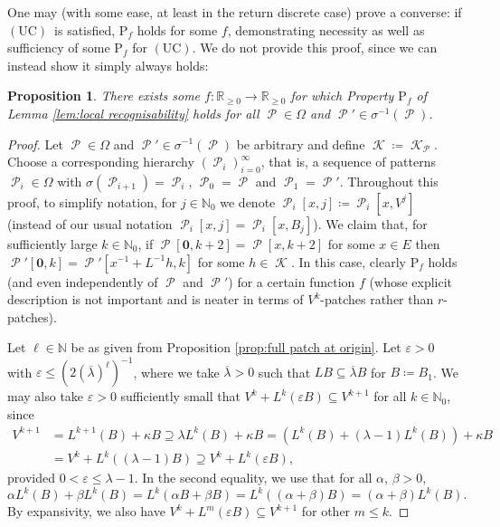 \documentclass[11pt]{amsart}
\numberwithin{equation}{section}
\theoremstyle{plain}
\newtheorem{proposition}[theorem]{Proposition}
\theoremstyle{definition}
\newcommand{\R}{\mathbb R}
\newcommand{\N}{\mathbb N}
\renewcommand{\epsilon}{\varepsilon}
\newcommand{\sub}{\sigma}
\DeclareMathOperator{\cP}{\mathcal{P}}
\DeclareMathOperator{\cK}{\mathcal{K}}
\newcommand{\UC}{\(\mathrm{(UC)}\)}
\begin{document}
One may (with some ease, at least in the return discrete case) prove a converse: if \UC\ is satisfied, \(\mathrm{P}_f\) holds for some \(f\), demonstrating necessity as well as sufficiency of some \(\mathrm{P}_f\) for \UC. We do not provide this proof, since we can instead show it simply always holds:

\begin{proposition}\label{prop:L-sub=>Pf}
There exists some \(f \colon \R_{\geq 0} \to \R_{\geq 0}\) for which Property \(\mathrm{P}_f\) of Lemma \ref{lem:local recognisability} holds for all \(\cP \in \Omega\) and \(\cP' \in \sub^{-1}(\cP)\).
\end{proposition}

\begin{proof}
Let \(\cP \in \Omega\) and \(\cP' \in \sub^{-1}(\cP)\) be arbitrary and define \(\cK \coloneqq \cK_{\cP}\). Choose a corresponding hierarchy \((\cP_i)_{i=0}^\infty\), that is, a sequence of patterns \(\cP_i \in \Omega\) with \(\sub(\cP_{i+1}) = \cP_i\), \(\cP_0 = \cP\) and \(\cP_1 = \cP'\). Throughout this proof, to simplify notation, for \(j \in \N_0\) we denote \(\cP_i[x,j] \coloneqq \cP_i[x,V^j]\) (instead of our usual notation \(\cP_i[x,j] = \cP_i[x,B_j]\)). We claim that, for sufficiently large \(k \in \N_0\), if \(\cP[\mathbf{0},k+2] = \cP[x,k+2]\) for some \(x \in E\) then \(\cP'[\mathbf{0},k] = \cP'[x^{-1} + L^{-1} h,k]\) for some \(h \in \cK\). In this case, clearly \(\mathrm{P}_f\) holds (and even independently of \(\cP\) and \(\cP'\)) for a certain function \(f\) (whose explicit description is not important and is neater in terms of \(V^k\)-patches rather than \(r\)-patches).

Let \(\ell \in \N\) be as given from Proposition \ref{prop:full patch at origin}. Let \(\epsilon > 0\) with \(\epsilon \leq (2(\overline{\lambda})^\ell)^{-1}\), where we take \(\overline{\lambda} > 0\) such that \(LB \subseteq \overline{\lambda} B\) for \(B \coloneqq B_1\). We may also take \(\epsilon > 0\) sufficiently small that \(V^k + L^k(\epsilon B) \subseteq V^{k+1}\) for all \(k \in \N_0\), since
\begin{align*}
V^{k+1} &= L^{k+1}(B) + \kappa B \supseteq \lambda L^k(B) + \kappa B = (L^k(B) + (\lambda - 1)L^k(B)) + \kappa B\\
        &= V^k + L^k((\lambda - 1)B) \supseteq V^k + L^k(\epsilon B) ,
\end{align*}
provided \(0 < \epsilon \leq \lambda - 1\). In the second equality, we use that for all \(\alpha\), \(\beta > 0\),
\[
\alpha L^k(B) + \beta L^k(B) = L^k(\alpha B + \beta B) = L^k((\alpha + \beta)B) = (\alpha + \beta)L^k(B) .
\]
By expansivity, we also have \(V^k + L^m(\epsilon B) \subseteq V^{k+1}\) for other \(m \leq k\).


\end{proof}
\end{document}
